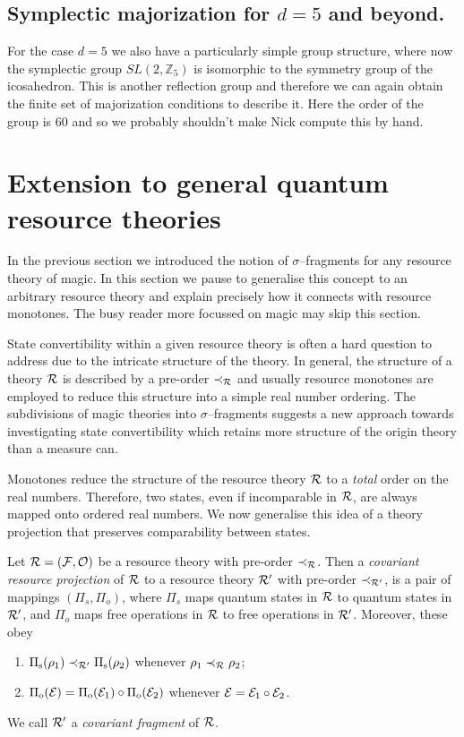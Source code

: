 \documentclass[pra,
aps,
twocolumn,
superscriptaddress,
groupedaddress,
nofootinbib,
reprint
]{revtex4-1}
\begin{document}
\subsection{Symplectic majorization for $d =5$ and beyond.}
For the case $d=5$ we also have a particularly simple group structure, where now the symplectic group $SL(2, \mathbb{Z}_5)$ is isomorphic to the symmetry group of the icosahedron. This is another reflection group and therefore we can again obtain the finite set of majorization conditions to describe it. Here the order of the group is $60$ and so we probably shouldn't make Nick compute this by hand.
\newpage
\section{Extension to general quantum resource theories}
\label{sec:frag}

In the previous section we introduced the notion of $\sigma$--fragments for any resource theory of magic. In this section we pause to generalise this concept to an arbitrary resource theory and explain precisely how it connects with resource monotones. The busy reader more focussed on magic may skip this section. 

State convertibility within a given resource theory is often a hard question to address due to the intricate structure of the theory.
In general, the structure of a theory $\mathcal{R}$ is described by a pre-order $\prec_{\mathcal{R}}$ and usually resource monotones are employed to reduce this structure into a simple real number ordering.
The subdivisions of magic theories into $\sigma$--fragments suggests a new approach towards investigating state convertibility which retains more structure of the origin theory than a measure can.

Monotones reduce the structure of the resource theory $\mathcal{R}$ to a \emph{total} order on the real numbers.
Therefore, two states, even if incomparable in $\mathcal{R}$, are always mapped onto ordered real numbers.
We now generalise this idea of a theory projection that preserves comparability between states. 
\begin{definition}\label{def:covproj}
Let $\mathcal{R} = (\mathcal{F}, \mathcal{O})$ be a resource theory with pre-order $\prec_{\mathcal{R}}$. 
Then a \emph{covariant resource projection} of $\mathcal{R}$ to a resource theory $\mathcal{R}'$ with pre-order $\prec_{\mathcal{R}'}$, is a pair of mappings $(\Pi_s, \Pi_o)$, where $\Pi_s$ maps quantum states in $\mathcal{R}$ to quantum states in $\mathcal{R}'$, and $\Pi_o$ maps free operations in $\mathcal{R}$ to free operations in $\mathcal{R}'$. 
Moreover, these obey
	\begin{enumerate}
        \item $\Pi_{\rm{s}}(\rho_1) \prec_{\mathcal{R}'} \Pi_{\rm{s}}(\rho_2)$ whenever $\rho_1 \prec_{\mathcal{R}} \rho_2$;
        \item $\Pi_{\rm{o}}(\mathcal{E}) = \Pi_{\rm{o}}(\mathcal{E}_1) \circ \Pi_{\rm{o}}(\mathcal{E}_2)$ whenever $\mathcal{E} = \mathcal{E}_1 \circ \mathcal{E}_2$.
    \end{enumerate}
We call $\mathcal{R}'$ a \emph{covariant fragment} of $\mathcal{R}$.
\end{definition}
\end{document}
